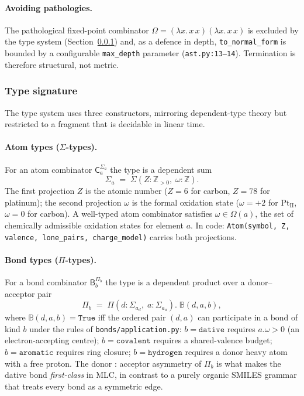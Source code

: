 \paragraph{Avoiding pathologies.}
The pathological fixed-point combinator
$\Omega = (\lambda x.\, x\,x)(\lambda x.\, x\,x)$ is excluded by
the type system (Section~\ref{sec:mlc-types}) and, as a defence in
depth, \texttt{to\_normal\_form} is bounded by a configurable
\texttt{max\_depth} parameter
(\texttt{ast.py:13--14}). Termination is therefore structural,
not metric.

\subsubsection{Type signature}
\label{sec:mlc-types}

The type system uses three constructors, mirroring dependent-type
theory but restricted to a fragment that is decidable in linear
time.

\paragraph{Atom types ($\Sigma$-types).}
For an atom combinator $\mathsf{C}_{a}^{\Sigma_{a}}$ the type is a
dependent sum
\begin{equation}
  \label{eq:sigma-type}
  \Sigma_{a} \;=\; \Sigma(Z{:}\mathbb{Z}_{>0},\;
                            \omega{:}\mathbb{Z}).
\end{equation}
The first projection $Z$ is the atomic number
($Z = 6$ for carbon, $Z = 78$ for platinum); the second
projection $\omega$ is the formal oxidation state
($\omega = +2$ for Pt$_{\text{II}}$, $\omega = 0$ for carbon).
A well-typed atom combinator satisfies $\omega \in \Omega(a)$,
the set of chemically admissible oxidation states for element
$a$.
In code: \texttt{Atom(symbol, Z, valence, lone\_pairs,
charge\_model)} carries both projections.

\paragraph{Bond types ($\Pi$-types).}
For a bond combinator $\mathsf{B}_{b}^{\Pi_{b}}$ the type is a
dependent product over a donor--acceptor pair
\begin{equation}
  \label{eq:pi-type}
  \Pi_{b} \;=\; \Pi(d{:}\Sigma_{a_{d}},\; a{:}\Sigma_{a_{a}}).\;
                 \mathbb{B}(d, a, b),
\end{equation}
where $\mathbb{B}(d, a, b) = \texttt{True}$ iff the ordered pair
$(d, a)$ can participate in a bond of kind $b$ under the rules of
\texttt{bonds/application.py}: $b = \texttt{dative}$ requires
$a.\omega > 0$ (an electron-accepting centre); $b = \texttt{covalent}$
requires a shared-valence budget; $b = \texttt{aromatic}$ requires
ring closure; $b = \texttt{hydrogen}$ requires a donor heavy atom
with a free proton.
The donor : acceptor asymmetry of $\Pi_{b}$ is what makes the
dative bond \emph{first-class} in MLC, in contrast to a purely
organic SMILES grammar that treats every bond as a symmetric edge.

